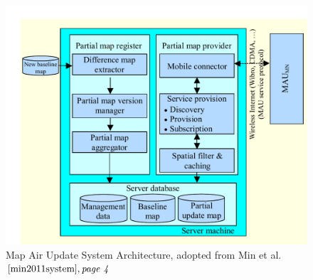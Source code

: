 \begin{figure}
\centering
\includegraphics[scale=.4]{MAU_Architecture.png}
\caption{Map Air Update System Architecture, adopted from Min et al.$\cite{min2011system}, \textit{page 4}$}
\label{fg:maus}
\end{figure}
